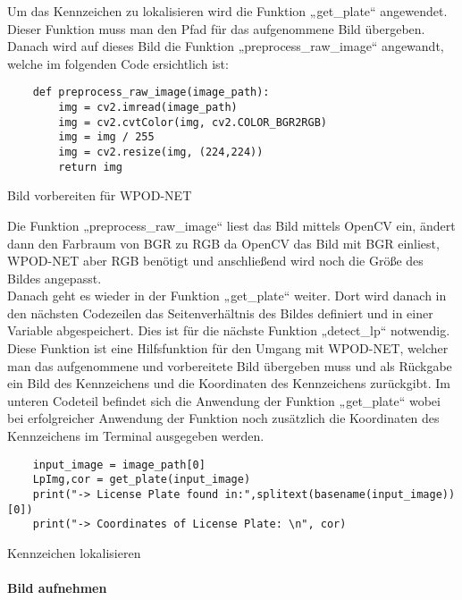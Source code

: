 Um das Kennzeichen zu lokalisieren wird die Funktion „get{\_}plate“ angewendet. Dieser Funktion muss man den Pfad für das aufgenommene 
Bild übergeben. Danach wird auf dieses Bild die Funktion „preprocess{\_}raw{\_}image“ angewandt, welche im folgenden Code ersichtlich ist:

\begin{listing}[H]
    \begin{verbatim}
    def preprocess_raw_image(image_path):
        img = cv2.imread(image_path)
        img = cv2.cvtColor(img, cv2.COLOR_BGR2RGB)
        img = img / 255
        img = cv2.resize(img, (224,224))
        return img
    \end{verbatim}
    \caption{Bild vorbereiten für WPOD-NET}
\end{listing}

Die Funktion „preprocess{\_}raw{\_}image“ liest das Bild mittels OpenCV ein, ändert dann den Farbraum von BGR zu RGB da OpenCV das Bild mit 
BGR einliest, WPOD-NET aber RGB benötigt und anschließend wird noch die Größe des Bildes angepasst.\\

Danach geht es wieder in der Funktion „get{\_}plate“ weiter. Dort wird danach in den nächsten Codezeilen das Seitenverhältnis des Bildes 
definiert und in einer Variable abgespeichert. Dies ist für die nächste Funktion „detect{\_}lp“ notwendig. Diese Funktion ist eine Hilfsfunktion 
für den Umgang mit WPOD-NET, welcher man das aufgenommene und vorbereitete Bild übergeben muss und als Rückgabe ein Bild des Kennzeichens und 
die Koordinaten des Kennzeichens zurückgibt. Im unteren Codeteil befindet sich die Anwendung der Funktion „get{\_}plate“ wobei bei erfolgreicher 
Anwendung der Funktion noch zusätzlich die Koordinaten des Kennzeichens im Terminal ausgegeben werden.

\begin{listing}[H]
    \begin{verbatim}
    input_image = image_path[0]
    LpImg,cor = get_plate(input_image)
    print("-> License Plate found in:",splitext(basename(input_image))[0])
    print("-> Coordinates of License Plate: \n", cor)
    \end{verbatim}
    \caption{Kennzeichen lokalisieren}
\end{listing}

\paragraph{Bild aufnehmen}\mbox{}\\

